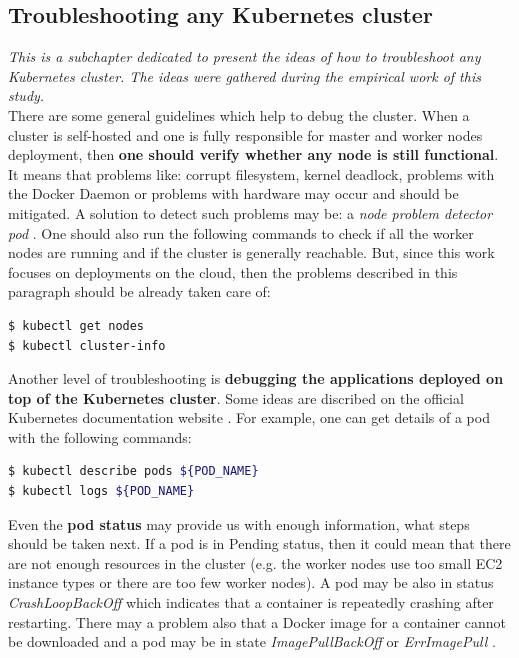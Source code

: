 \subsection{Troubleshooting any Kubernetes cluster}
\textit{This is a subchapter dedicated to present the ideas of how to troubleshoot any Kubernetes cluster. The ideas were gathered during the empirical work of this study.}
\\

There are some general guidelines which help to debug the cluster. When a cluster is self-hosted and one is fully responsible for master and worker nodes deployment, then \textbf{one should verify whether any node is still functional}. It means that problems like: corrupt filesystem, kernel deadlock, problems with the Docker Daemon or problems with hardware may occur and should be mitigated. A solution to detect such problems may be: a \textit{node problem detector pod} \cite{book-mastering-k8s}. One should also run the following commands to check if all the worker nodes are running and if the cluster is generally reachable. But, since this work focuses on deployments on the cloud, then the problems described in this paragraph should be already taken care of:
\begin{lstlisting}[basicstyle=\scriptsize,xleftmargin=0cm,label=lst:5-ts1,caption={Getting information about a cluster},captionpos=b,language=Bash ]
$ kubectl get nodes
$ kubectl cluster-info
\end{lstlisting}

Another level of troubleshooting is \textbf{debugging the applications deployed on top of the Kubernetes cluster}. Some ideas are discribed on the official Kubernetes documentation website \cite{k8s-deb}. For example, one can get details of a pod with the following commands:
\begin{lstlisting}[basicstyle=\scriptsize,xleftmargin=0cm,label=lst:5-ts2,caption={Getting information about pods},captionpos=b,language=Bash ]
$ kubectl describe pods ${POD_NAME}
$ kubectl logs ${POD_NAME}
\end{lstlisting}

Even the \textbf{pod status} may provide us with enough information, what steps should be taken next. If a pod is in Pending status, then it could mean that there are not enough resources in the cluster (e.g. the worker nodes use too small EC2 instance types or there are too few worker nodes). A pod may be also in status \textit{CrashLoopBackOff} which indicates that a container is repeatedly crashing after restarting. There may a problem also that a Docker image for a container cannot be downloaded and a pod may be in state \textit{ImagePullBackOff} or \textit{ErrImagePull} \cite{k8s-google-tr}.

